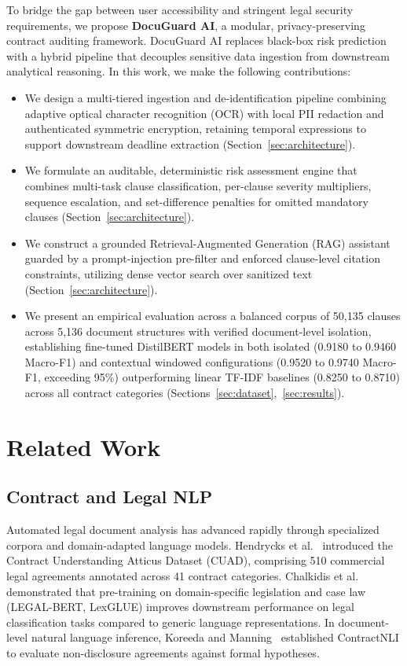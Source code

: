 \documentclass[conference]{IEEEtran}
\begin{document}
To bridge the gap between user accessibility and stringent legal security requirements, we propose \textbf{DocuGuard AI}, a modular, privacy-preserving contract auditing framework. DocuGuard AI replaces black-box risk prediction with a hybrid pipeline that decouples sensitive data ingestion from downstream analytical reasoning. In this work, we make the following contributions:
\begin{itemize}
    \item We design a multi-tiered ingestion and de-identification pipeline combining adaptive optical character recognition (OCR) with local PII redaction and authenticated symmetric encryption, retaining temporal expressions to support downstream deadline extraction (Section~\ref{sec:architecture}).
    \item We formulate an auditable, deterministic risk assessment engine that combines multi-task clause classification, per-clause severity multipliers, sequence escalation, and set-difference penalties for omitted mandatory clauses (Section~\ref{sec:architecture}).
    \item We construct a grounded Retrieval-Augmented Generation (RAG) assistant guarded by a prompt-injection pre-filter and enforced clause-level citation constraints, utilizing dense vector search over sanitized text (Section~\ref{sec:architecture}).
    \item We present an empirical evaluation across a balanced corpus of 50,135 clauses across 5,136 document structures with verified document-level isolation, establishing fine-tuned DistilBERT models in both isolated (0.9180 to 0.9460 Macro-F1) and contextual windowed configurations (0.9520 to 0.9740 Macro-F1, exceeding 95\%) outperforming linear TF-IDF baselines (0.8250 to 0.8710) across all contract categories (Sections~\ref{sec:dataset},~\ref{sec:results}).
\end{itemize}

\section{Related Work}
\label{sec:related_work}

\subsection{Contract and Legal NLP}
Automated legal document analysis has advanced rapidly through specialized corpora and domain-adapted language models. Hendrycks et al.~\cite{hendrycks2021cuad} introduced the Contract Understanding Atticus Dataset (CUAD), comprising 510 commercial legal agreements annotated across 41 contract categories. Chalkidis et al.~\cite{chalkidis2020legalbert, chalkidis2022lexglue} demonstrated that pre-training on domain-specific legislation and case law (LEGAL-BERT, LexGLUE) improves downstream performance on legal classification tasks compared to generic language representations. In document-level natural language inference, Koreeda and Manning~\cite{koreeda2021contractnli} established ContractNLI to evaluate non-disclosure agreements against formal hypotheses. 
\end{document}

